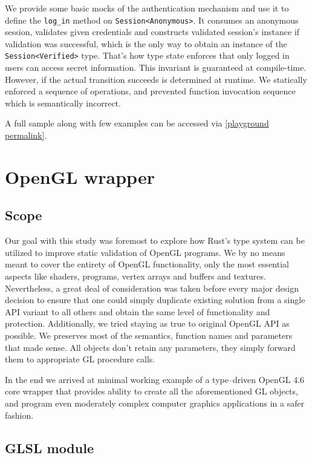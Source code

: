 We provide some basic mocks of the authentication mechanism and use it to define the \texttt{log\_in} method on \texttt{Session<Anonymous>}.
It consumes an anonymous session, validates given credentials and constructs validated session's instance if validation was successful,
which is the only way to obtain an instance of the \texttt{Session<Verified>} type.
That's how type state enforces that only logged in users can access secret information. This invariant is guaranteed at compile-time.
However, if the actual transition succeeds is determined at runtime. We statically enforced a sequence of operations, and prevented
function invocation sequence which is semantically incorrect.

A full sample along with few examples can be accessed via \noindent \href{https://play.rust-lang.org/?version=stable&mode=debug&edition=2021&gist=bb0ff57d61dcdc9f4473cf51bec012a3}{[playground permalink]}.

\section{OpenGL wrapper}
  
\subsection*{Scope}

Our goal with this study was foremost to explore how Rust's type system can be utilized to improve static validation of OpenGL programs.
We by no means meant to cover the entirety of OpenGL functionality, only the most essential aspects like shaders, programs, vertex arrays and buffers and textures.
Nevertheless, a great deal of consideration was taken before every major design decision to ensure that one could simply duplicate existing solution from a single 
API variant to all others and obtain the same level of functionality and protection.
Additionally, we tried staying as true to original OpenGL API as possible. We preserves most of the semantics, function names and parameters that made sense.
All objects don't retain any parameters, they simply forward them to appropriate GL procedure calls. 

In the end we arrived at minimal working example of a type--driven OpenGL 4.6 core wrapper that provides ability to create all the aforementioned GL objects,
and program even moderately complex computer graphics applications in a safer fashion.

\subsection{GLSL module}

